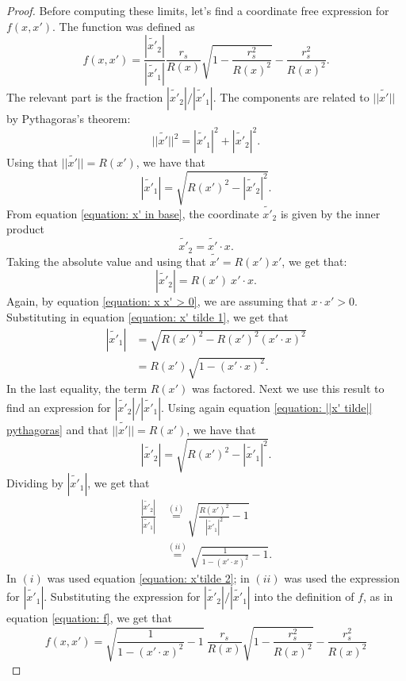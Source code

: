 \documentclass[10pt,a4paper]{amsart}
\begin{document}
\begin{proof}
	Before computing these limits, let's find a coordinate free expression for $f(x,x')$. The function was defined as
	\begin{equation}
		f(x, x') = \frac{|\widetilde{x'}_2|}{|\widetilde{x'}_1|} \frac{r_s}{R(x)} \sqrt{1 - \frac{r_s^2}{R(x)^2}} -\frac{r_s^2}{R(x)^2} .
	\end{equation}
	The relevant part is the fraction $|\widetilde{x'}_2| / |\widetilde{x'}_1|$. The components are related to $||\widetilde{x'}||$ by Pythagoras's theorem:
	\begin{equation}
		\label{equation: ||x' tilde|| pythagoras}
		||\widetilde{x'}||^2 = |\widetilde{x'}_1|^2 + |\widetilde{x'}_2|^2 .
	\end{equation}
	Using that $||\widetilde{x'}|| = R(x')$, we have that
	\begin{equation}
		\label{equation: x' tilde 1}
		|\widetilde{x'}_1| = \sqrt{R(x')^2 - |\widetilde{x'}_2|^2 }.
	\end{equation}
	From equation \ref{equation: x' in base}, the coordinate $\widetilde{x'}_2$ is given by the inner product
	\begin{equation}
		\widetilde{x'}_2 = \widetilde{x'} \cdot x.
	\end{equation}
	Taking the absolute value and using that $\widetilde{x'} = R(x') x'$, we get that:
	\begin{equation}
		|\widetilde{x'}_2 | = R(x') \ x' \cdot x.
	\end{equation}
	Again, by equation \ref{equation: x x' > 0}, we are assuming that $x \cdot x' > 0$. Substituting in equation \ref{equation: x' tilde 1}, we get that
	\begin{align*}
		|\widetilde{x'}_1| &= \sqrt{R(x')^2 - R(x')^2 (x' \cdot x )^2 } \\
		&= R(x') \sqrt{1 - (x' \cdot x )^2 }.
	\end{align*}
	In the last equality, the term $R(x')$ was factored. Next we use this result to find an expression for $|\widetilde{x'}_2|/|\widetilde{x'}_1|$. Using again equation \ref{equation: ||x' tilde|| pythagoras} and that $||\widetilde{x'}|| = R(x')$, we have that
	\begin{equation}
		\label{equation: x'tilde 2}
		|\widetilde{x'}_2| = \sqrt{R(x')^2 - |\widetilde{x'}_1|^2 }.
	\end{equation}
	Dividing by $|\widetilde{x'}_1 |$, we get that
	\begin{align*}
		\frac{|\widetilde{x'}_2|}{|\widetilde{x'}_1|} &\stackrel{(i)}{=} \sqrt{\frac{R(x')^2}{|\widetilde{x'}_1|^2} - 1 } \\
		&\stackrel{(ii)}{=} \sqrt{ \frac{1}{1 - (x' \cdot x )^2} -1}.
	\end{align*}
	In $(i)$ was used equation \ref{equation: x'tilde 2}; in $(ii)$ was used the expression for $|\widetilde{x'}_1|$. Substituting the expression for $|\widetilde{x'}_2| / |\widetilde{x'}_1|$ into the definition of $f$, as in equation \ref{equation: f}, we get that
	\begin{equation}
		\label{equation: f coordinate free}
		f(x,x') = \sqrt{ \frac{1}{1 - (x' \cdot x)^2} -1} \ \frac{r_s}{R(x)} \sqrt{1 - \frac{r_s^2}{R(x)^2}} -\frac{r_s^2}{R(x)^2}
	\end{equation}
	

\end{proof}
\end{document}
